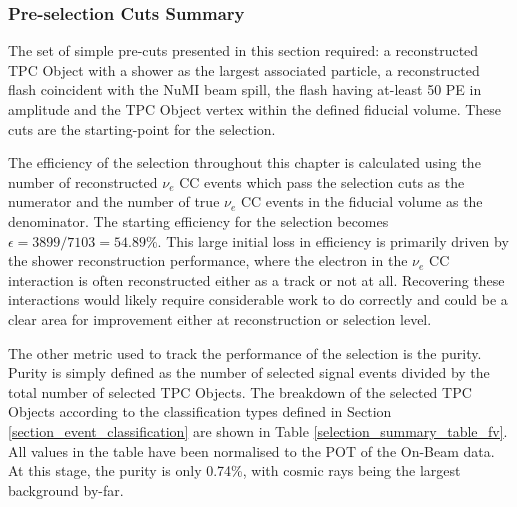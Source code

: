 \subsubsection{Pre-selection Cuts Summary}

The set of simple pre-cuts presented in this section required: a reconstructed TPC Object with a shower as the largest associated particle, a reconstructed flash coincident with the NuMI beam spill, the flash having at-least 50 PE in amplitude and the TPC Object vertex within the defined fiducial volume. These cuts are the starting-point for the selection.

The efficiency of the selection throughout this chapter is calculated using the number of reconstructed $\nu_e$ CC events which pass the selection cuts as the numerator and the number of true $\nu_e$ CC events in the fiducial volume as the denominator. The starting efficiency for the selection becomes $\epsilon = 3899 / 7103 = 54.89\%$. This large initial loss in efficiency is primarily driven by the shower reconstruction performance, where the electron in the $\nu_e$ CC interaction is often reconstructed either as a track or not at all. Recovering these interactions would likely require considerable work to do correctly and could be a clear area for improvement either at reconstruction or selection level.

The other metric used to track the performance of the selection is the purity. Purity is simply defined as the number of selected signal events divided by the total number of selected TPC Objects. The breakdown of the selected TPC Objects according to the classification types defined in Section \ref{section_event_classification} are shown in Table \ref{selection_summary_table_fv}. All values in the table have been normalised to the POT of the On-Beam data. At this stage, the purity is only 0.74\%, with cosmic rays being the largest background by-far. 


